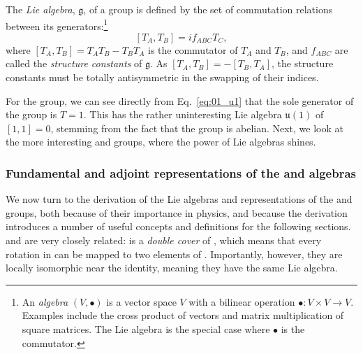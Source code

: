 \begin{definition}
\label{def:01_lie_algebra}
The \textit{Lie algebra}, $\mathfrak{g}$, of a group is defined by the set of commutation relations between its generators:\footnote{An \textit{algebra} $(V, \bullet)$ is a vector space $V$ with a bilinear operation $\bullet: V \times V \rightarrow V$.
Examples include the cross product of vectors and matrix multiplication of square matrices.
The Lie algebra is the special case where $\bullet$ is the commutator.}
\begin{equation}
	\label{eq:01_lie_algebra}
	[T_A, T_B] = i f_{ABC} T_C,
\end{equation}
where $[T_A, T_B] = T_A T_B - T_B T_A$ is the commutator of $T_A$ and $T_B$, and $f_{ABC}$ are called the \textit{structure constants} of $\mathfrak{g}$.
As $[T_A, T_B] = -[T_B, T_A]$, the structure constants must be totally antisymmetric in the swapping of their indices.
\end{definition}

\begin{example}
\label{example:01_u1_lie}
For the \UU[1] group,  we can see directly from Eq.~\ref{eq:01_u1} that the sole generator of the group is $T = 1$.
This has the rather uninteresting Lie algebra $\mathfrak{u}(1)$ of $[1, 1] = 0$, stemming from the fact that the group is abelian.
Next, we look at the more interesting \SO[3] and \SU[2] groups, where the power of Lie algebras shines.
\end{example}


\label{sec:01_symmetries_so3}

\subsubsection{Fundamental and adjoint representations of the \so[3] and \su[2] algebras}

We now turn to the derivation of the Lie algebras and representations of the \SO[3] and \SU[2] groups, both because of their importance in physics, and because the derivation introduces a number of useful concepts and definitions for the following sections.
\SO[3] and \SU[2] are very closely related: \SU[2] is a \textit{double cover} of \SO[3], which means that every rotation in \SO[3] can be mapped to two elements of \SU[2].
Importantly, however, they are locally isomorphic near the identity, meaning they have the same Lie algebra.

